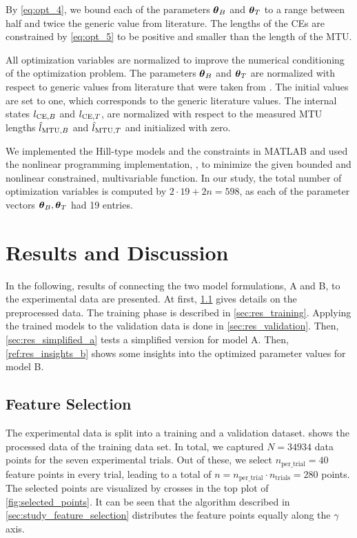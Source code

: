By \cref{eq:opt_4}, we bound each of the parameters $\boldsymbol{\theta}_B$ and $\boldsymbol{\theta}_T$ to a range between half and twice the generic value from literature.
The lengths of the CEs are constrained by \cref{eq:opt_5} to be positive and smaller than the length of the MTU.

All optimization variables are normalized to improve the numerical conditioning of the optimization problem. 
The parameters $\boldsymbol{\theta}_B$ and $\boldsymbol{\theta}_T$ are normalized with respect to generic values from literature that were taken from \cite{Gunther2007, Morl2012, Hilltype2014}. The initial values are set to one, which corresponds to the generic literature values.
The internal states $l_{\text{CE},B}$ and $l_{\text{CE},T}$, are normalized with respect to the measured MTU lengths $\hat{l}_{\text{MTU},B}$ and $\hat{l}_{\text{MTU},T}$ and initialized with zero.

We implemented the Hill-type models and the constraints in MATLAB and used the nonlinear programming implementation, , to minimize the given bounded and nonlinear constrained, multivariable function.
In our study, the total number of optimization variables is computed by $2\cdot 19 + 2n = 598$, as each of the parameter vectors $\boldsymbol{\theta}_B,\boldsymbol{\theta}_T$ had 19 entries. 

\section{Results and Discussion}\label{sec:evaluation}

In the following, results of connecting the two model formulations, A and B, to the experimental data are presented.
At first, \cref{sec:res_feature_selection} gives details on the preprocessed data. The training phase is described in \cref{sec:res_training}. Applying the trained models to the validation data is done in \cref{sec:res_validation}. Then, \cref{sec:res_simplified_a} tests a simplified version for model A. Then, \cref{ref:res_insights_b} shows some insights into the optimized parameter values for model B.

\subsection{Feature Selection}\label{sec:res_feature_selection}
The experimental data is split into a training and a validation dataset.  shows the processed data of the training data set. In total, we captured $N=\num{34934}$ data points for the seven experimental trials. Out of these, we select $n_\text{per\_trial}=\num{40}$ feature points in every trial, leading to a total of $n=n_\text{per\_trial}\cdot n_\text{trials}=\num{280}$ points. The selected points are visualized by crosses in the top plot of \cref{fig:selected_points}. It can be seen that the algorithm described in \cref{sec:study_feature_selection} distributes the feature points equally along the $\gamma$ axis.

